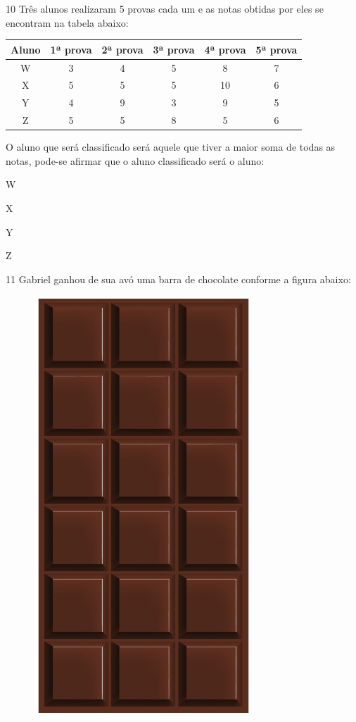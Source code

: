 \num{10} Três alunos realizaram 5 provas cada um e as notas obtidas por
eles se encontram na tabela abaixo:

\begin{center}
\begin{tabular}{c|ccccc}
\hline
\multicolumn{1}{l|}{\textbf{Aluno}} & \multicolumn{1}{l}{\textbf{1ª prova}} & \multicolumn{1}{l}{\textbf{2ª prova}} & \multicolumn{1}{l}{\textbf{3ª prova}} & \multicolumn{1}{l}{\textbf{4ª prova}} & \multicolumn{1}{l}{\textbf{5ª prova}} \\ \hline
W & 3 & 4 & 5 & 8 & 7 \\ \hline
X & 5 & 5 & 5 & 10 & 6 \\ \hline
Y & 4 & 9 & 3 & 9 & 5 \\ \hline
Z & 5 & 5 & 8 & 5 & 6 \\ \hline
\end{tabular}
\end{center}

O aluno que será classificado será aquele que tiver a maior
soma de todas as notas, pode-se afirmar que o aluno classificado será o
aluno:

\begin{minipage}{.5\textwidth}
\begin{escolha}
\item
  W
\item
  X
\item
  Y
\item
  Z
\end{escolha}
\end{minipage}

\pagebreak
\num{11} Gabriel ganhou de sua avó uma barra de chocolate conforme a 
figura abaixo:

\begin{figure}[htpb!]
\centering
\includegraphics[width=.2\textwidth]{../ilustracoes/MAT5/SAEB_5ANO_MAT_figura120.png}
\end{figure}

